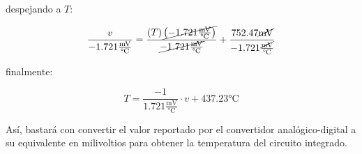 \noindent
despejando a $T$:

\begin{equation*}
	\frac{v}{-1.721\frac{\text{mV}}{\text{°C}}} =
		\frac{\left(T\right)\cancel{\left(-1.721\frac{\text{mV}}{\text{°C}}\right)}}{\cancel{-1.721\frac{\text{mV}}{\text{°C}}}} +
	  	\frac{752.47\cancel{\text{mV}}}{-1.721\frac{\cancel{\text{mV}}}{\text{°C}}}
\end{equation*}

\noindent
finalmente:

\begin{equation}%
	\label{eqn:v-to-temp}
	T = \frac{-1}{1.721\frac{\text{mV}}{\text{°C}}} \cdot v + 437.23\text{°C}
\end{equation}

Así, bastará con convertir el valor reportado por el convertidor analógico-digital a su equivalente en milivoltios para obtener la temperatura del circuito integrado.
